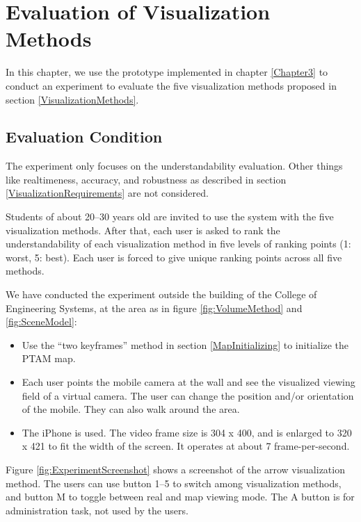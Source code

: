 \chapter{Evaluation of Visualization Methods}
\label{Chapter4}

In this chapter, we use the prototype implemented in chapter \ref{Chapter3} to conduct an experiment to evaluate the five visualization methods proposed in section \ref{VisualizationMethods}.


\section{Evaluation Condition}

The experiment only focuses on the understandability evaluation. Other things like realtimeness, accuracy, and robustness as described in section \ref{VisualizationRequirements} are not considered.

Students of about 20--30 years old are invited to use the system with the five visualization methods. After that, each user is asked to rank the understandability of each visualization method in five levels of ranking points (1: worst, 5: best). Each user is forced to give unique ranking points across all five methods.

We have conducted the experiment outside the building of the College of Engineering Systems, at the area as in figure \ref{fig:VolumeMethod} and \ref{fig:SceneModel}:

\begin{itemize}
	\item Use the ``two keyframes'' method in section \ref{MapInitializing} to initialize the PTAM map.
	\item Each user points the mobile camera at the wall and see the visualized viewing field of a virtual camera. The user can change the position and/or orientation of the mobile. They can also walk around the area.
	\item The iPhone is used. The video frame size is 304 x 400, and is enlarged to 320 x 421 to fit the width of the screen. It operates at about 7 frame-per-second.
\end{itemize}

Figure \ref{fig:ExperimentScreenshot} shows a screenshot of the arrow visualization method. The users can use button 1--5 to switch among visualization methods, and button M to toggle between real and map viewing mode. The A button is for administration task, not used by the users.

